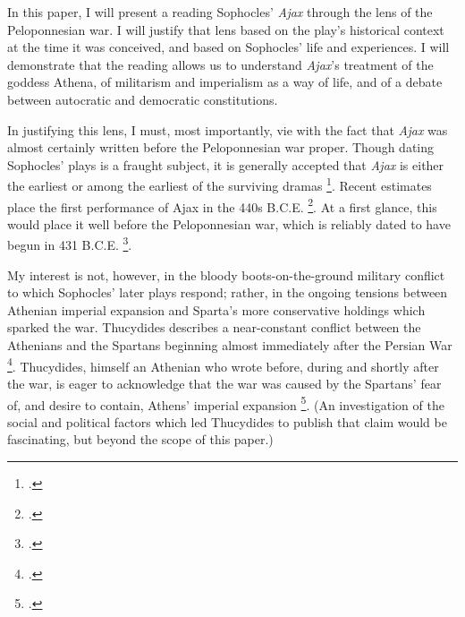
In this paper, I will present a reading Sophocles' \textit{Ajax} through the lens of the
Peloponnesian war. I will justify that lens based on the play's historical context at the
time it was conceived, and based on Sophocles' life and experiences. I will demonstrate
that the reading allows us to understand \textit{Ajax}'s treatment of the goddess Athena,
of militarism and imperialism as a way of life, and of a debate between autocratic and
democratic constitutions.



In justifying this lens, I must, most importantly, vie with the fact that \textit{Ajax}
was almost certainly written before the Peloponnesian war proper. Though dating Sophocles'
plays is a fraught subject, it is generally accepted that \textit{Ajax} is either the
earliest or among the earliest of the surviving dramas \footcites[\enquote{Dating the
Plays}]{meineck_four}[p. 38]{bates_soph}. Recent estimates place the first performance
of Ajax in the 440s B.C.E. \footcite[p. 10]{finglass_ajax}. At a first glance, this would
place it well before the Peloponnesian war, which is reliably dated to have begun in 431
B.C.E. \footcite[p. 32]{lazenby_war}.

My interest is not, however, in the bloody boots-on-the-ground military conflict to which
Sophocles' later plays respond; rather, in the ongoing tensions between Athenian imperial
expansion and Sparta's more conservative holdings which sparked the war. Thucydides
describes a near-constant conflict between the Athenians and the Spartans beginning almost
immediately after the Persian War \footcite[ch. 1.18]{thucydides_war}. Thucydides, himself
an Athenian who wrote before, during and shortly after the war, is eager to acknowledge
that the war was caused by the Spartans' fear of, and desire to contain, Athens' imperial
expansion  \footcite[ch. 1.23]{thucydides_war}. (An investigation of the social and
political factors which led Thucydides to publish that claim would be fascinating, but
beyond the scope of this paper.)





